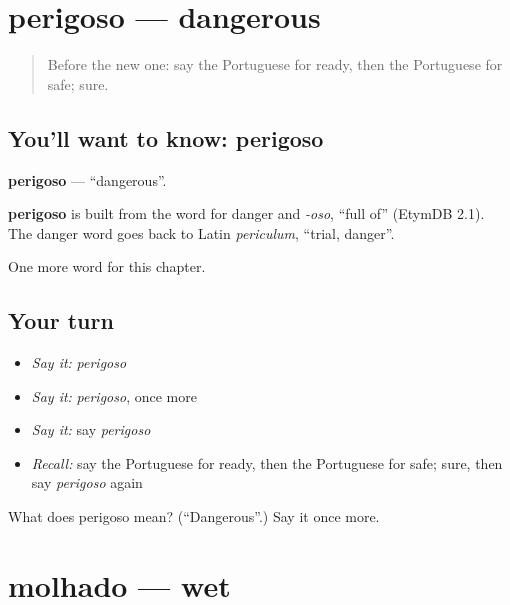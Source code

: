 \section[perigoso]{perigoso — dangerous}

\label{lesson:PT-C125-perigoso}



\begin{quote}
Before the new one: say the Portuguese for ready, then the Portuguese for safe; sure.
\end{quote}

\subsection*{You'll want to know: perigoso}
\textbf{perigoso} — \textquotedblleft{}dangerous\textquotedblright{}.

\begin{cousinweb}
\textbf{perigoso} is built from the word for danger and \emph{-oso}, \textquotedblleft{}full of\textquotedblright{} (EtymDB 2.1). The danger word goes back to Latin \emph{periculum}, \textquotedblleft{}trial, danger\textquotedblright{}.
\end{cousinweb}

\begin{grammarlens}[title={What you've built}]
One more word for this chapter.
\end{grammarlens}

\subsection*{Your turn}
\begin{itemize}
\raggedright
  \item \emph{Say it:} \emph{perigoso}
  \item \emph{Say it:} \emph{perigoso}, once more
  \item \emph{Say it:} say \emph{perigoso}
  \item \emph{Recall:} say the Portuguese for ready, then the Portuguese for safe; sure, then say \emph{perigoso} again
\end{itemize}

\begin{tcolorbox}[breakable,colback=teal!4,colframe=teal!35!black,title={Before you move on}]
What does perigoso mean? (\textquotedblleft{}Dangerous\textquotedblright{}.) Say it once more.
\end{tcolorbox}
\section[molhado]{molhado — wet}

